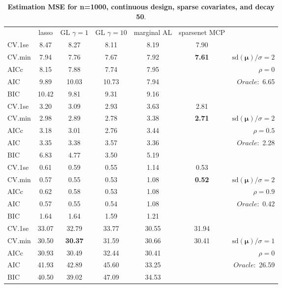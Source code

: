 \begin{table}\vspace{-.5cm}
\caption[l]{ { \bf Estimation MSE for n=1000, continuous design, 
sparse covariates, and  decay  50}.}
\vspace{-.5cm}
\footnotesize{}
\begin{center}
\begin{tabular}{l*{5}{c}|r}
& lasso & GL $\gamma=1$ & GL $\gamma=10$ & marginal AL & sparsenet MCP  & \\
 \cline{1-7}
CV.1se & 8.47 & 8.27 & 8.11 & 8.19 & 7.90 & \\
CV.min & 7.94 & 7.76 & 7.67 & 7.92 & {\bf 7.61} &  $\mathrm{sd}(\mathbf{\mu})/\sigma=2$ \\
AICc & 8.15 & 7.88 & 7.74 & 7.95 & & $\rho=0$ \\
AIC & 9.89 & 10.03 & 10.73 & 7.94 & &  \multirow{2}{*}{$Oracle: $ 6.65} \\
BIC & 10.42 & 9.81 & 9.31 & 9.16 & &  \\
 \hline 
CV.1se & 3.20 & 3.09 & 2.93 & 3.63 & 2.81 & \\
CV.min & 2.98 & 2.89 & 2.78 & 3.38 & {\bf 2.71} &  $\mathrm{sd}(\mathbf{\mu})/\sigma=2$ \\
AICc & 3.18 & 3.01 & 2.76 & 3.44 & & $\rho=0.5$ \\
AIC & 3.35 & 3.38 & 3.57 & 3.36 & &  \multirow{2}{*}{$Oracle: $ 2.28} \\
BIC & 6.83 & 4.77 & 3.50 & 5.19 & &  \\
 \hline 
CV.1se & 0.61 & 0.59 & 0.55 & 1.14 & 0.53 & \\
CV.min & 0.57 & 0.55 & 0.53 & 1.08 & {\bf 0.52} &  $\mathrm{sd}(\mathbf{\mu})/\sigma=2$ \\
AICc & 0.62 & 0.58 & 0.53 & 1.08 & & $\rho=0.9$ \\
AIC & 0.57 & 0.55 & 0.54 & 1.08 & &  \multirow{2}{*}{$Oracle: $ 0.42} \\
BIC & 1.64 & 1.64 & 1.59 & 1.21 & &  \\
 \hline 
CV.1se & 33.07 & 32.79 & 33.77 & 30.55 & 31.94 & \\
CV.min & 30.50 & {\bf 30.37} & 31.59 & 30.66 & 30.41 &  $\mathrm{sd}(\mathbf{\mu})/\sigma=1$ \\
AICc & 30.93 & 30.49 & 32.44 & 30.41 & & $\rho=0$ \\
AIC & 41.93 & 42.89 & 45.60 & 33.25 & &  \multirow{2}{*}{$Oracle: $ 26.59} \\
BIC & 40.50 & 39.02 & 47.09 & 34.53 & &  \\

\end{tabular}
\end{center}
\end{table}
